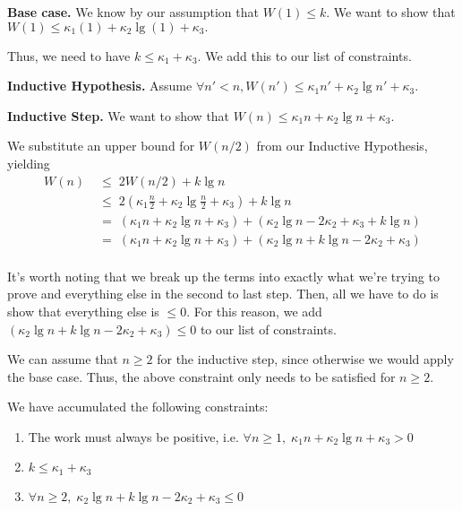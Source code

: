 \begin{gram}
\textbf{Base case.}
We know by our assumption that $W(1) \leq k$.
We want to show that $W(1) \leq \kappa_1 (1) + \kappa_2 \lg (1) + \kappa_3.$

Thus, we need to have
$k \leq \kappa_1 + \kappa_3$. We add this to our list of constraints.
\end{gram}

\begin{gram}
\textbf{Inductive Hypothesis.}
Assume $\forall n' < n, W(n') \leq \kappa_1 n' + \kappa_2 \lg n' + \kappa_3$.
\end{gram}

\begin{gram}
\textbf{Inductive Step.}
We want to show that $W(n) \leq \kappa_1 n + \kappa_2 \lg n + \kappa_3$.

We substitute an upper bound for $W(n/2)$ from our Inductive Hypothesis, yielding
\begin{align*}
W(n) \;& \leq \; 2 W(n/2) + k\lg n\\
  \;& \leq \; 2 \left(\kappa_1 \frac{n}{2} + \kappa_2 \lg \frac{n}{2} + \kappa_3 \right) + k \lg n\\
  \;& = \; \left(\kappa_1 n + \kappa_2 \lg n + \kappa_3 \right) + \left(\kappa_2 \lg n - 2 \kappa_2 + \kappa_3 + k \lg n \right) \\
  \;& = \; \left(\kappa_1 n + \kappa_2 \lg n + \kappa_3 \right) + \left(\kappa_2 \lg n + k \lg n - 2 \kappa_2 + \kappa_3 \right) \\
\end{align*}
\end{gram}

\begin{note}
It's worth noting that we break up the terms into exactly what we're trying to prove
and everything else in the second to last step. Then, all we have to do is show
that everything else is $\leq 0$. For this reason, we add
$\left(\kappa_2 \lg n + k \lg n - 2 \kappa_2 + \kappa_3 \right) \leq 0$
to our list of constraints.

We can assume that $n \geq 2$ for the inductive step,
since otherwise we would apply the base case. Thus, the above constraint only needs
to be satisfied for $n \geq 2$.
\end{note}

\begin{gram}
We have accumulated the following constraints:
\begin{enumerate}
\item The work must always be positive, i.e. $\forall n \geq 1, \; \kappa_1 n + \kappa_2 \lg n + \kappa_3 > 0$
\item $k \leq \kappa_1 + \kappa_3$
\item $\forall n \geq 2, \; \kappa_2 \lg n + k \lg n - 2 \kappa_2 + \kappa_3 \leq 0$
\end{enumerate}
\end{gram}

